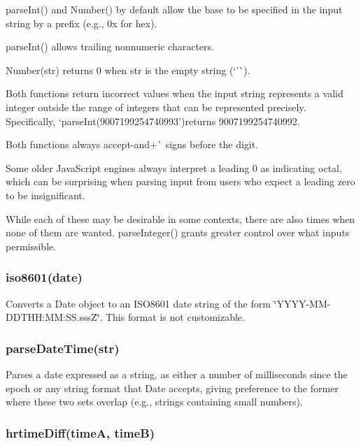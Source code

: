 \begin{DoxyItemize}
\item {\ttfamily parse\+Int()} and {\ttfamily Number()} by default allow the base to be specified in the input string by a prefix (e.\+g., {\ttfamily 0x} for hex).
\item {\ttfamily parse\+Int()} allows trailing nonnumeric characters.
\item {\ttfamily Number(str)} returns 0 when {\ttfamily str} is the empty string (`'\textquotesingle{}\`{}).
\item Both functions return incorrect values when the input string represents a valid integer outside the range of integers that can be represented precisely. Specifically, `parse\+Int(\textquotesingle{}9007199254740993'){\ttfamily returns 9007199254740992.}
\item {\ttfamily Both functions always accept}-\/{\ttfamily and}+\`{} signs before the digit.
\item Some older Java\+Script engines always interpret a leading 0 as indicating octal, which can be surprising when parsing input from users who expect a leading zero to be insignificant.
\end{DoxyItemize}

While each of these may be desirable in some contexts, there are also times when none of them are wanted. {\ttfamily parse\+Integer()} grants greater control over what input\textquotesingle{}s permissible.

\subsubsection*{iso8601(date)}

Converts a Date object to an I\+S\+O8601 date string of the form \char`\"{}\+Y\+Y\+Y\+Y-\/\+M\+M-\/\+D\+D\+T\+H\+H\+:\+M\+M\+:\+S\+S.\+sss\+Z\char`\"{}. This format is not customizable.

\subsubsection*{parse\+Date\+Time(str)}

Parses a date expressed as a string, as either a number of milliseconds since the epoch or any string format that Date accepts, giving preference to the former where these two sets overlap (e.\+g., strings containing small numbers).

\subsubsection*{hrtime\+Diff(time\+A, time\+B)}

